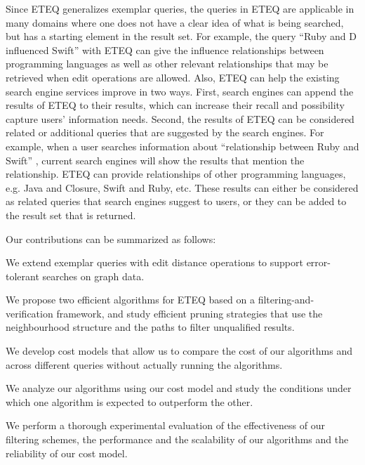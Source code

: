 \documentclass{sigmod}
\begin{document}
Since ETEQ generalizes exemplar queries, the queries in ETEQ are applicable in many domains 
where one does not have a clear idea of what is being searched, but has a starting element in the result set. 
 For example, the query ``Ruby and D influenced Swift'' with ETEQ can give the influence relationships between programming languages as well as other relevant relationships that may be retrieved when edit operations are allowed. Also, ETEQ can help the existing search engine services improve in two ways. First, search engines can append the results of ETEQ to their results, which can increase their recall and possibility capture users' information needs. Second, the results of ETEQ can be considered related or additional queries that are suggested by the search engines. For example, when a user searches information about ``relationship between Ruby and Swift'' , current search engines will show the results that mention the relationship. ETEQ can provide relationships of other programming languages, e.g. Java and Closure, Swift and Ruby, etc. These results can either be considered as related queries that search engines suggest to users, or they can be added to the result set that is returned.

Our contributions can be summarized as follows:
\begin{compactitem}
\item We extend exemplar queries with edit distance operations to support error-tolerant searches on graph data. 
\item We propose two efficient algorithms for ETEQ based on a filtering-and-verification framework, and study  efficient pruning strategies that use the neighbourhood structure and the paths to filter unqualified results.
\item We develop cost models that allow us to compare the cost of our algorithms and across different queries without actually running the algorithms. 
\item We analyze our algorithms using our cost model and study the conditions under which one algorithm is expected to outperform the other.
\item We perform a thorough experimental evaluation of the effectiveness of our filtering schemes, the performance and the scalability of our algorithms and the reliability of our cost model.
\end{compactitem}
\end{document}
